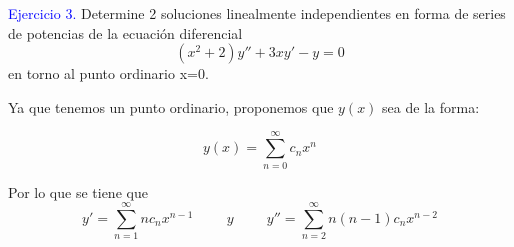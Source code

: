 \textcolor{blue}{Ejercicio 3.} Determine 2 soluciones linealmente independientes en forma de series de potencias de la ecuación diferencial
\begin{equation}
    (x^{2}+2)y'' +3xy' -y = 0 
    \label{eq:ecuación_ejer_3}
\end{equation}
en torno al punto ordinario x=0.

Ya que tenemos un punto ordinario, proponemos que $y(x)$ sea de la forma:

\begin{equation}
    y(x) = \sum_{n = 0}^{\infty}c_{n}x^{n}
    \label{eq:y(x)}
\end{equation}

Por lo que se tiene que 
\begin{equation}
    y'= \sum_{n = 1}^{\infty}nc_{n}x^{n -1} \hspace{1cm} y \hspace{1cm} y'' = \sum_{n = 2}^{\infty}n(n -1)c_{n}x^{n -2}
    \label{eq:derivadas}
\end{equation}

